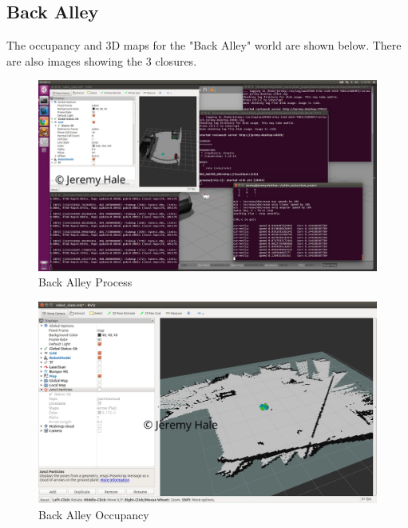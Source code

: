 \documentclass[10pt,journal,compsoc]{IEEEtran}
\begin{document}
\subsection{Back Alley}

The occupancy and 3D maps for the "Back Alley" world are shown below. There are also images showing the 3 closures.

\begin{figure}
    \centering
    \includegraphics[width=\linewidth]{alley}
    \caption{Back Alley Process}
    \label{fig:alley_process}
\end{figure}

\begin{figure}
    \centering
    \includegraphics[width=\linewidth]{alley_occupancy}
    \caption{Back Alley Occupancy}
    \label{fig:alley_2d}
\end{figure}
\end{document}

